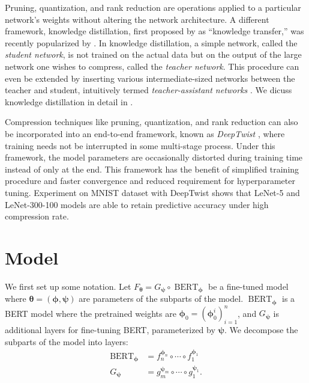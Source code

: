 \documentclass[10pt]{article}
\newcommand{\bert}{\operatorname{BERT}}
\newcommand{\btheta}{{\bm{\theta}}}
\newcommand{\bphi}{{\bm{\phi}}}
\newcommand{\bpsi}{{\bm{\psi}}}
\begin{document}
Pruning, quantization, and rank reduction are operations applied to a
particular network's weights without altering the network architecture. 
A different framework, knowledge distillation, first proposed by 
\citep{bucilua2006model} as
``knowledge transfer,'' was recently popularized by
\citep{hinton2015distilling}. In knowledge distillation, a simple network,
called the \emph{student network}, is not trained on the actual data but on
the output of the large network one wishes to compress, called the 
\emph{teacher network}. This procedure can even be extended by inserting
various
intermediate-sized networks between the teacher and student, intuitively
termed
\emph{teacher-assistant networks} \citep{mirzadeh2019improved}. We dicuss
knowledge distillation in detail in .


Compression techniques like pruning, quantization, and rank reduction can
also be incorporated into an end-to-end framework, known as 
\emph{DeepTwist}  \citep{lee2018deeptwist}, where training needs not be
interrupted in some multi-stage process. Under this
framework, the model parameters are occasionally distorted during training
time instead of only at the end. This framework has the benefit of simplified
training procedure and faster convergence and reduced requirement for
hyperparameter tuning. Experiment on MNIST dataset with DeepTwist shows that
LeNet-5 and LeNet-300-100 models are able to retain predictive accuracy under
high compression rate.



\section{Model}
\label{sec:model}

We first set up some notation. Let $F_\btheta = G_\bpsi \circ \bert_\bphi$ be
a fine-tuned model where $\btheta = (\bphi, \bpsi)$ are parameters of the
subparts of the model. $\bert_\bphi$ is a BERT model where the pretrained
weights are $\bphi_0 = (\bphi_0^i)_{i=1}^n$, and $G_\bpsi$ is additional
layers for fine-tuning BERT, parameterized by $\bpsi$. We decompose the
subparts of the model into layers: \begin{align*}
\bert_\bphi &= f_{n}^{\bphi_n} \circ \cdots \circ f_1^{\bphi_1} \\
G_\bpsi &= g_{m}^{\bpsi_m} \circ \cdots \circ g_1^{\bpsi_1}.
\end{align*}

\end{document}
